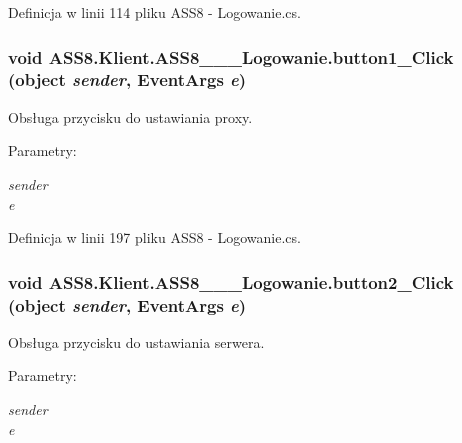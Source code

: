 Definicja w linii 114 pliku ASS8 - Logowanie.cs.\hypertarget{a00001_3afd4168471fd7bd4dbca5337d608d8e}{
\subsubsection[{button1\_\-Click}]{\setlength{\rightskip}{0pt plus 5cm}void ASS8.Klient.ASS8\_\-\_\-\_\-Logowanie.button1\_\-Click (object {\em sender}, \/  EventArgs {\em e})}}
\label{d8/d84/a00001_3afd4168471fd7bd4dbca5337d608d8e}


Obsługa przycisku do ustawiania proxy. 

\begin{Desc}
\item[Parametry:]
\begin{description}
\item[{\em sender}]\item[{\em e}]\end{description}
\end{Desc}


Definicja w linii 197 pliku ASS8 - Logowanie.cs.\hypertarget{a00001_0c15aacb6337578b24d5bfac65b7261d}{
\subsubsection[{button2\_\-Click}]{\setlength{\rightskip}{0pt plus 5cm}void ASS8.Klient.ASS8\_\-\_\-\_\-Logowanie.button2\_\-Click (object {\em sender}, \/  EventArgs {\em e})}}
\label{d8/d84/a00001_0c15aacb6337578b24d5bfac65b7261d}


Obsługa przycisku do ustawiania serwera. 

\begin{Desc}
\item[Parametry:]
\begin{description}
\item[{\em sender}]\item[{\em e}]\end{description}
\end{Desc}


